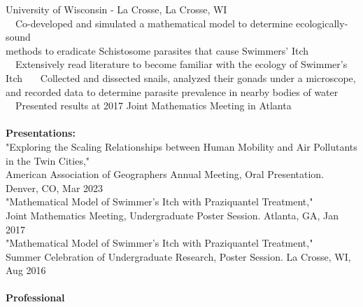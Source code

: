\documentclass[letterpaper,12pt]{article}
\numberwithin{equation}{section}
\begin{document}
\hspace*{1.16in} University of Wisconsin - La Crosse, La Crosse, WI \vspace*{.1cm}\\
\hspace*{1.2in} \textbullet ~~Co-developed and simulated a mathematical model to determine ecologically-sound \\\hspace*{1.6in} methods to eradicate Schistosome parasites that cause Swimmers' Itch \\
\hspace*{1.2in} \textbullet ~~Extensively read literature to become familiar with the ecology of Swimmer's Itch
\hspace*{1.2in} \textbullet ~~~Collected and dissected snails, analyzed their gonads under a microscope, \\
\hspace*{1.6in} and recorded data to determine parasite prevalence in nearby bodies of water\\
\hspace*{1.2in} \textbullet ~~Presented results at 2017 Joint Mathematics Meeting in Atlanta
\\\\
\noindent\textbf{Presentations:}
\vspace*{.3cm} \\
"Exploring the Scaling Relationships between Human Mobility and Air Pollutants in the Twin Cities,"
\\ \indent American Association of Geographers Annual Meeting, Oral Presentation. Denver, CO, Mar 2023
\vspace*{.1cm} \\
"Mathematical Model of Swimmer's Itch with Praziquantel Treatment," 
\\ \indent Joint Mathematics Meeting, Undergraduate Poster Session. Atlanta, GA, Jan 2017
\vspace*{.1cm} \\
"Mathematical Model of Swimmer's Itch with Praziquantel Treatment,"
\\ \indent Summer Celebration of Undergraduate Research, Poster Session. La Crosse, WI, Aug 2016
\\\\
\noindent\textbf{Professional}\\
\end{document}
